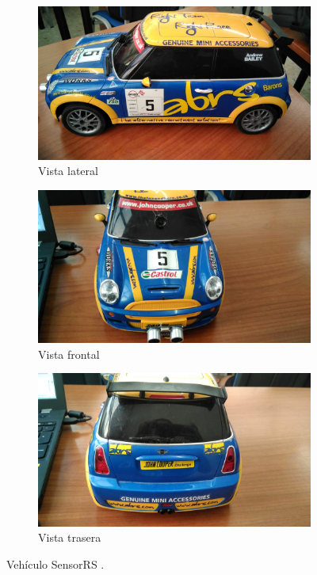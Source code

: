 \begin{figure}[H]
    \centering
    \begin{subfigure}[b]{0.5\textwidth}
        \includegraphics[width=\textwidth]{imagenes/robot/vehiculo_lateral.jpeg}
        \caption{Vista lateral}
        \label{fig:gull}
    \end{subfigure}
    \begin{subfigure}[b]{0.5\textwidth}
        \includegraphics[width=\textwidth]{imagenes/robot/vehiculo_frontal.jpeg}
        \caption{Vista frontal}
        \label{fig:tiger}
    \end{subfigure}
    \begin{subfigure}[b]{0.5\textwidth}
        \includegraphics[width=\textwidth]{imagenes/robot/vehiculo_trasera.jpeg}
        \caption{Vista trasera}
        \label{fig:mouse}
    \end{subfigure}
    \caption{Vehículo SensorRS \protect\footnotemark.}\label{fig:animals}
\end{figure}


